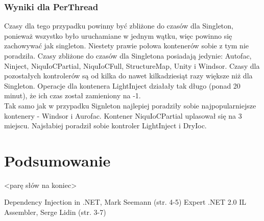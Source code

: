 \documentclass[12pt]{article}
\begin{document}
\subsubsection{Wyniki dla PerThread}
Czasy dla tego przypadku powinny być zbliżone do czasów dla Singleton, ponieważ wszystko było uruchamiane w jednym wątku, więc powinno się zachowywać jak singleton. Niestety prawie połowa kontenerów sobie z tym nie poradziła. Czasy zbliżone do czasów dla Singletona posiadają jedynie: Autofac, Ninject, NiquIoCPartial, NiquIoCFull, StructureMap, Unity i Windsor. Czasy dla pozostałych kontrolerów są od kilka do nawet kilkadziesiąt razy większe niż dla Singleton. Operacje dla kontenera LightInject działały tak długo (ponad 20 minut), że ich czas został zamieniony na -1.\\
Tak samo jak w przypadku Signleton najlepiej poradziły sobie najpopularniejsze kontenery - Windsor i Aurofac. Kontener NiquIoCPartial uplasował się na 3 miejscu. Najsłabiej poradził sobie kontroler LightInject i DryIoc.



\section{Podsumowanie}
<parę słów na koniec>

\newpage
\begin{thebibliography}{authordate1}
 Dependency Injection in .NET, Mark Seemann (str. 4-5)
 Expert .NET 2.0 IL Assembler, Serge Lidin (str. 3-7)
\end{thebibliography}
\end{document}
